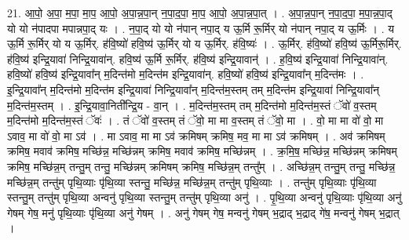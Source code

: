 \documentclass[17pt]{extarticle}
\begin{document}
21. आ॒पो॒ अ॒पा॒ म॒पा॒ मा॒प॒ आ॒पो॒ अ॒पा॒न्न॒पा॒न् न॒पा॒द॒पा॒ मा॒प॒ आ॒पो॒ अ॒पा॒न्न॒पा॒त् । . अ॒पा॒न्न॒पा॒न् न॒पा॒द॒पा॒ म॒पा॒न्न॒पा॒द् यो यो न॑पादपा मपान्नपा॒द् यः । . न॒पा॒द् यो यो न॑पान् नपा॒द् य ऊ॒र्मि रू॒र्मिर् यो न॑पान् नपा॒द् य ऊ॒र्मिः । . य ऊ॒र्मि रू॒र्मिर् यो य ऊ॒र्मिर्. ह॑वि॒ष्यो॑ हवि॒ष्य॑ ऊ॒र्मिर् यो य ऊ॒र्मिर्. ह॑वि॒ष्यः॑ । . ऊ॒र्मिर्. ह॑वि॒ष्यो॑ हवि॒ष्य॑ ऊ॒र्मिरू॒र्मिर्. ह॑वि॒ष्य॑ इन्द्रि॒यावा॑ निन्द्रि॒यावा॑न्. हवि॒ष्य॑ ऊ॒र्मि रू॒र्मिर्. ह॑वि॒ष्य॑ इन्द्रि॒यावान्॑ । . ह॒वि॒ष्य॑ इन्द्रि॒यावा॑ निन्द्रि॒यावा॑न्. हवि॒ष्यो॑ हवि॒ष्य॑ इन्द्रि॒यावा᳚न् म॒दिन्त॑मो म॒दिन्त॑म इन्द्रि॒यावा॑न्. हवि॒ष्यो॑ हवि॒ष्य॑ इन्द्रि॒यावा᳚न् म॒दिन्त॑मः । . इ॒न्द्रि॒यावा᳚न् म॒दिन्त॑मो म॒दिन्त॑म इन्द्रि॒यावा॑ निन्द्रि॒यावा᳚न् म॒दिन्त॑म॒स्तम् तम् म॒दिन्त॑म इन्द्रि॒यावा॑ निन्द्रि॒यावा᳚न् म॒दिन्त॑म॒स्तम् । . इ॒न्द्रि॒यावा॒निती᳚न्द्रि॒य - वा॒न् । . म॒दिन्त॑म॒स्तम् तम् म॒दिन्त॑मो म॒दिन्त॑म॒स्तं ॅवो॑ व॒स्तम् म॒दिन्त॑मो म॒दिन्त॑म॒स्तं ॅवः॑ । . तं ॅवो॑ व॒स्तम् तं ॅवो॒ मा मा व॒स्तम् तं ॅवो॒ मा । . वो॒ मा मा वो॑ वो॒ मा ऽवाव॒ मा वो॑ वो॒ मा ऽव॑ । . मा ऽवाव॒ मा मा ऽव॑ क्रमिषम् क्रमिष॒ मव॒ मा मा ऽव॑ क्रमिषम् । . अव॑ क्रमिषम् क्रमिष॒ मवाव॑ क्रमिष॒ मच्छि॑न्न॒ मच्छि॑न्नम् क्रमिष॒ मवाव॑ क्रमिष॒ मच्छि॑न्नम् । . क्र॒मि॒ष॒ मच्छि॑न्न॒ मच्छि॑न्नम् क्रमिषम् क्रमिष॒ मच्छि॑न्न॒म् तन्तु॒म् तन्तु॒ मच्छि॑न्नम् क्रमिषम् क्रमिष॒ मच्छि॑न्न॒म् तन्तु᳚म् । . अच्छि॑न्न॒म् तन्तु॒म् तन्तु॒ मच्छि॑न्न॒ मच्छि॑न्न॒म् तन्तु॑म् पृथि॒व्याः पृ॑थि॒व्या स्तन्तु॒ मच्छि॑न्न॒ मच्छि॑न्न॒म् तन्तु॑म् पृथि॒व्याः । . तन्तु॑म् पृथि॒व्याः पृ॑थि॒व्या स्तन्तु॒म् तन्तु॑म् पृथि॒व्या अन्वनु॑ पृथि॒व्या स्तन्तु॒म् तन्तु॑म् पृथि॒व्या अनु॑ । . पृ॒थि॒व्या अन्वनु॑ पृथि॒व्याः पृ॑थि॒व्या अनु॑ गेषम् गेष॒ मनु॑ पृथि॒व्याः पृ॑थि॒व्या अनु॑ गेषम् । . अनु॑ गेषम् गेष॒ मन्वनु॑ गेषम् भ॒द्राद् भ॒द्राद् गे॑ष॒ मन्वनु॑ गेषम् भ॒द्रात् । \newline
\end{document}

